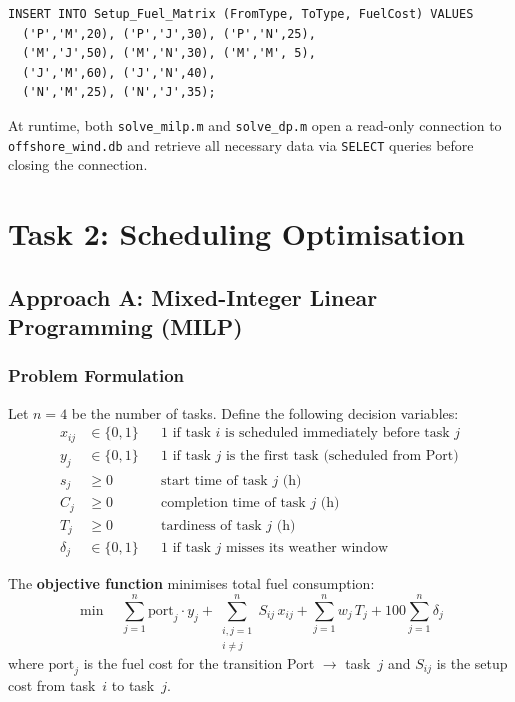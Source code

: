 \documentclass[11pt,a4paper]{article}
\begin{document}
\begin{lstlisting}[style=sqlstyle, caption={DML: data insertion (Setup\_Fuel\_Matrix).}]
INSERT INTO Setup_Fuel_Matrix (FromType, ToType, FuelCost) VALUES
  ('P','M',20), ('P','J',30), ('P','N',25),
  ('M','J',50), ('M','N',30), ('M','M', 5),
  ('J','M',60), ('J','N',40),
  ('N','M',25), ('N','J',35);
\end{lstlisting}

At runtime, both \texttt{solve\_milp.m} and \texttt{solve\_dp.m} open a
read-only connection to \texttt{offshore\_wind.db} and retrieve all
necessary data via \texttt{SELECT} queries before closing the connection.

\section{Task 2: Scheduling Optimisation}

\subsection{Approach A: Mixed-Integer Linear Programming (MILP)}

\subsubsection{Problem Formulation}

Let $n = 4$ be the number of tasks. Define the following decision variables:
\begin{align*}
    x_{ij} &\in \{0,1\} && \text{1 if task } i \text{ is scheduled immediately before task } j\\
    y_j    &\in \{0,1\} && \text{1 if task } j \text{ is the first task (scheduled from Port)}\\
    s_j    &\geq 0      && \text{start time of task } j \text{ (h)}\\
    C_j    &\geq 0      && \text{completion time of task } j \text{ (h)}\\
    T_j    &\geq 0      && \text{tardiness of task } j \text{ (h)}\\
    \delta_j &\in \{0,1\} && \text{1 if task } j \text{ misses its weather window}
\end{align*}

The \textbf{objective function} minimises total fuel consumption:
\begin{equation}
    \min \quad \sum_{j=1}^{n} \text{port}_j \cdot y_j
             + \sum_{\substack{i,j=1\\i \neq j}}^{n} S_{ij}\,x_{ij}
             + \sum_{j=1}^{n} w_j\,T_j
             + 100\sum_{j=1}^{n} \delta_j
    \label{eq:milp_obj}
\end{equation}
where $\text{port}_j$ is the fuel cost for the transition Port $\to$ task~$j$
and $S_{ij}$ is the setup cost from task~$i$ to task~$j$.
\end{document}
